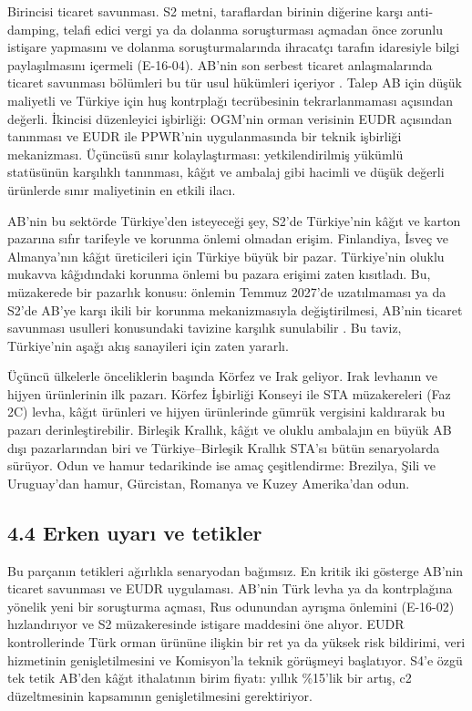 Birincisi ticaret savunması. S2 metni, taraflardan birinin diğerine karşı anti-damping, telafi edici vergi ya da dolanma soruşturması açmadan önce zorunlu istişare yapmasını ve dolanma soruşturmalarında ihracatçı tarafın idaresiyle bilgi paylaşılmasını içermeli (E-16-04). AB'nin son serbest ticaret anlaşmalarında ticaret savunması bölümleri bu tür usul hükümleri içeriyor \etiketD{}. Talep AB için düşük maliyetli ve Türkiye için huş kontrplağı tecrübesinin tekrarlanmaması açısından değerli. İkincisi düzenleyici işbirliği: OGM'nin orman verisinin EUDR açısından tanınması ve EUDR ile PPWR'nin uygulanmasında bir teknik işbirliği mekanizması. Üçüncüsü sınır kolaylaştırması: yetkilendirilmiş yükümlü statüsünün karşılıklı tanınması, kâğıt ve ambalaj gibi hacimli ve düşük değerli ürünlerde sınır maliyetinin en etkili ilacı.

AB'nin bu sektörde Türkiye'den isteyeceği şey, S2'de Türkiye'nin kâğıt ve karton pazarına sıfır tarifeyle ve korunma önlemi olmadan erişim. Finlandiya, İsveç ve Almanya'nın kâğıt üreticileri için Türkiye büyük bir pazar. Türkiye'nin oluklu mukavva kâğıdındaki korunma önlemi bu pazara erişimi zaten kısıtladı. Bu, müzakerede bir pazarlık konusu: önlemin Temmuz 2027'de uzatılmaması ya da S2'de AB'ye karşı ikili bir korunma mekanizmasıyla değiştirilmesi, AB'nin ticaret savunması usulleri konusundaki tavizine karşılık sunulabilir \etiketH{}. Bu taviz, Türkiye'nin aşağı akış sanayileri için zaten yararlı.

Üçüncü ülkelerle önceliklerin başında Körfez ve Irak geliyor. Irak levhanın ve hijyen ürünlerinin ilk pazarı. Körfez İşbirliği Konseyi ile STA müzakereleri (Faz 2C) levha, kâğıt ürünleri ve hijyen ürünlerinde gümrük vergisini kaldırarak bu pazarı derinleştirebilir. Birleşik Krallık, kâğıt ve oluklu ambalajın en büyük AB dışı pazarlarından biri ve Türkiye--Birleşik Krallık STA'sı bütün senaryolarda sürüyor. Odun ve hamur tedarikinde ise amaç çeşitlendirme: Brezilya, Şili ve Uruguay'dan hamur, Gürcistan, Romanya ve Kuzey Amerika'dan odun.

\hypertarget{nace_kartlar_16-18-44-erken-uyarux131-ve-tetikler}{%
\subsection{4.4 Erken uyarı ve tetikler}\label{nace_kartlar_16-18-44-erken-uyarux131-ve-tetikler}}

Bu parçanın tetikleri ağırlıkla senaryodan bağımsız. En kritik iki gösterge AB'nin ticaret savunması ve EUDR uygulaması. AB'nin Türk levha ya da kontrplağına yönelik yeni bir soruşturma açması, Rus odunundan ayrışma önlemini (E-16-02) hızlandırıyor ve S2 müzakeresinde istişare maddesini öne alıyor. EUDR kontrollerinde Türk orman ürününe ilişkin bir ret ya da yüksek risk bildirimi, veri hizmetinin genişletilmesini ve Komisyon'la teknik görüşmeyi başlatıyor. S4'e özgü tek tetik AB'den kâğıt ithalatının birim fiyatı: yıllık \%15'lik bir artış, c2 düzeltmesinin kapsamının genişletilmesini gerektiriyor.

